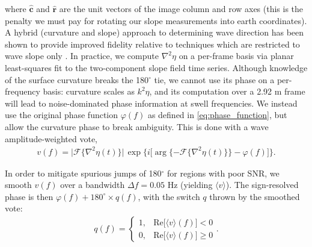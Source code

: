 \documentclass[letterpaper,draftcls,onecolumn]{IEEEtran}
\begin{document}
\noindent where $\hat{\mathbf{c}}$ and $\hat{\mathbf{r}}$ are the unit vectors of the image column and row axes (this is the penalty we must pay for rotating our slope measurements into earth coordinates). A hybrid (curvature and slope) approach to determining wave direction has been shown to provide improved fidelity relative to techniques which are restricted to wave slope only \cite{queiroz_determining_2016}. In practice, we compute $\nabla^{2}\eta$ on a per-frame basis via planar least-squares fit to the two-component slope field time series. Although knowledge of the surface curvature breaks the 180$^{\circ}$ tie, we cannot use its phase on a per-frequency basis: curvature scales as $k^{2}\eta$, and its computation over a 2.92 m frame will lead to noise-dominated phase information at swell frequencies. We instead use the original phase function $\varphi(f)$ as defined in \eqref{eq:phase_function}, but allow the curvature phase to break ambiguity. This is done with a wave amplitude-weighted vote,
\begin{align}
	v(f) = \big|\mathcal{F}\{\nabla^{2}\eta(t)\}\big|\,
	\exp\Big\{i\big[\arg\{-\mathcal{F}\{\nabla^{2}\eta(t)\}\}-\varphi(f)\big]\Big\}.
	\label{eq:curvature_vote}
\end{align}

\vspace{-4pt}

\noindent In order to mitigate spurious jumps of 180$^{\circ}$ for regions with poor SNR, we smooth $v(f)$ over a bandwidth $\Delta f=0.05$ Hz (yielding $\langle v\rangle$). The sign-resolved phase is then $\varphi(f)+180^{\circ} \times q(f)$, with the switch $q$ thrown by the smoothed vote:
\begin{align}
	q(f) = \begin{cases}
		1, & \mathrm{Re}\big[\langle v\rangle(f)\big] < 0\\[2pt]
		0, & \mathrm{Re}\big[\langle v\rangle(f)\big] \geq 0
	\end{cases}.
	\label{eq:curvature_switch}
\end{align}

\vspace{-4pt}
\end{document}

